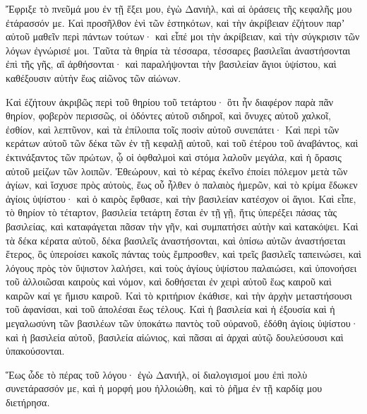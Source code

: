 {\par }{\PP {}Ἔφριξε τὸ πνεῦμά μου ἐν τῇ ἕξει μου, ἐγὼ Δανιὴλ, καὶ αἱ ὁράσεις τῆς κεφαλῆς μου ἐτάρασσόν με.
Καὶ προσῆλθον ἑνὶ τῶν ἑστηκότων, καὶ τὴν ἀκρίβειαν ἐζήτουν παρʼ αὐτοῦ μαθεῖν περὶ πάντων τούτων· καὶ εἶπέ μοι τὴν ἀκρίβειαν, καὶ τὴν σύγκρισιν τῶν λόγων ἐγνώρισέ μοι.
Ταῦτα τὰ θηρία τὰ τέσσαρα, τέσσαρες βασιλεῖαι ἀναστήσονται ἐπὶ τῆς γῆς, αἳ ἀρθήσονται·
καὶ παραλήψονται τὴν βασιλείαν ἅγιοι ὑψίστου, καὶ καθέξουσιν αὐτὴν ἕως αἰῶνος τῶν αἰώνων.
\par }{\PP {}Καὶ ἐζήτουν ἀκριβῶς περὶ τοῦ θηρίου τοῦ τετάρτου· ὃτι ἦν διαφέρον παρὰ πᾶν θηρίον, φοβερὸν περισσῶς, οἱ ὀδόντες αὐτοῦ σιδηροῖ, καὶ ὄνυχες αὐτοῦ χαλκοῖ, ἐσθίον, καὶ λεπτῦνον, καὶ τὰ ἐπίλοιπα τοῖς ποσὶν αὐτοῦ συνεπάτει·
Καὶ περὶ τῶν κεράτων αὐτοῦ τῶν δέκα τῶν ἐν τῇ κεφαλῇ αὐτοῦ, καὶ τοῦ ἐτέρου τοῦ ἀναβάντος, καὶ ἐκτινάξαντος τῶν πρώτων, ᾧ οἱ ὀφθαλμοὶ καὶ στόμα λαλοῦν μεγάλα, καὶ ἡ ὅρασις αὐτοῦ μείζων τῶν λοιπῶν.
Ἐθεώρουν, καὶ τὸ κέρας ἐκεῖνο ἐποίει πόλεμον μετὰ τῶν ἁγίων, καὶ ἴσχυσε πρὸς αὐτοὺς,
ἕως οὗ ἦλθεν ὁ παλαιὸς ἡμερῶν, καὶ τὸ κρίμα ἔδωκεν ἁγίοις ὑψίστου· καὶ ὁ καιρὸς ἔφθασε, καὶ τὴν βασιλείαν κατέσχον οἱ ἅγιοι.
Καὶ εἶπε, τὸ θηρίον τὸ τέταρτον, βασιλεία τετάρτη ἔσται ἐν τῇ γῇ, ἥτις ὑπερέξει πάσας τὰς βασιλείας, καὶ καταφάγεται πᾶσαν τὴν γῆν, καὶ συμπατήσει αὐτὴν καὶ κατακόψει.
Καὶ τὰ δέκα κέρατα αὐτοῦ, δέκα βασιλεῖς ἀναστήσονται, καὶ ὀπίσω αὐτῶν ἀναστήσεται ἕτερος, ὃς ὑπεροίσει κακοῖς πάντας τοὺς ἔμπροσθεν, καὶ τρεῖς βασιλεῖς ταπεινώσει,
καὶ λόγους πρὸς τὸν ὕψιστον λαλήσει, καὶ τοὺς ἁγίους ὑψίστου παλαιώσει, καὶ ὑπονοήσει τοῦ ἀλλοιῶσαι καιροὺς καὶ νόμον, καὶ δοθήσεται ἐν χειρὶ αὐτοῦ ἕως καιροῦ καὶ καιρῶν καί γε ἥμισυ καιροῦ.
Καὶ τὸ κριτήριον ἐκάθισε, καὶ τὴν ἀρχὴν μεταστήσουσι τοῦ ἀφανίσαι, καὶ τοῦ ἀπολέσαι ἕως τέλους.
Καὶ ἡ βασιλεία καὶ ἡ ἐξουσία καὶ ἡ μεγαλωσύνη τῶν βασιλέων τῶν ὑποκάτω παντὸς τοῦ οὐρανοῦ, ἐδόθη ἁγίοις ὑψίστου· καὶ ἡ βασιλεία αὐτοῦ, βασιλεία αἰώνιος, καὶ πᾶσαι αἱ ἀρχαὶ αὐτῷ δουλεύσουσι καὶ ὑπακούσονται.
\par }{\PP Ἕως ὧδε τὸ πέρας τοῦ λόγου·
ἐγὼ Δανιήλ, οἱ διαλογισμοί μου ἐπὶ πολὺ συνετάρασσόν με, καὶ ἡ μορφή μου ἠλλοιώθη, καὶ τὸ ῥῆμα ἐν τῇ καρδίᾳ μου διετήρησα.

}
